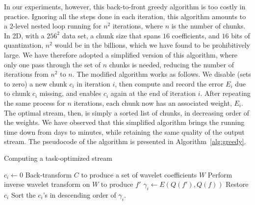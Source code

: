 In our experiments, however, this back-to-front greedy algorithm is too costly in practice. Ignoring
all the steps done in each iteration, this algorithm amounts to a 2-level nested loop running for
$n^2$ iterations, where $n$ is the number of chunks. In 2D, with a $256^2$ data set, a chunk size
that spans $16$ coefficients, and $16$ bits of quantization, $n^2$ would be in the billions, which
we have found to be prohibitively large. We have therefore adopted a simplified version of this
algorithm, where only one pass through the set of $n$ chunks is needed, reducing the number of
iterations from $n^2$ to $n$. The modified algorithm works as follows. We disable (sets to zero) a
new chunk $c_i$ in iteration $i$, then compute and record the error $E_i$ due to chunk $c_i$
missing, and enables $c_i$ again at the end of iteration $i$. After repeating the same process for
$n$ iterations, each chunk now has an associated weight, $E_i$. The optimal stream, then, is simply
a sorted list of chunks, in decreasing order of the weights. We have observed that this simplified
algorithm brings the running time down from days to minutes, while retaining the same quality of the
output stream. The pseudocode of the algorithm is presented in Algorithm~\ref{alg:greedy}.

\begin{algorithm}[h]
  \caption{Computing a task-optimized stream}
  \begin{algorithmic}[1]
			\State $c_i \gets 0$
      \State Back-transform $C$ to produce a set of wavelet coefficients $W$
			\State Perform inverse wavelet transform on $W$ to produce $f'$
			\State $\gamma_i \gets E(Q(f'),Q(f))$			
			\State Restore $c_i$
		\EndFor
		\State Sort the $c_i$'s in descending order of $\gamma_i$.
	\end{algorithmic}
	\label{alg:greedy}
\end{algorithm}

